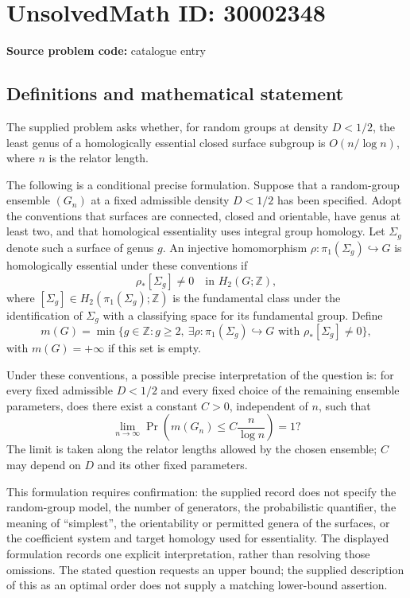 \documentclass[11pt]{article}
\newcommand{\Z}{\mathbb{Z}}
\begin{document}
\section*{UnsolvedMath ID: 30002348}
\textbf{Source problem code:} catalogue entry
\subsection{Definitions and mathematical statement}
The supplied problem asks whether, for random groups at density \(D<1/2\), the least genus of a homologically essential closed surface subgroup is \(O(n/\log n)\), where \(n\) is the relator length.

The following is a conditional precise formulation. Suppose that a random-group ensemble \((G_n)\) at a fixed admissible density \(D<1/2\) has been specified. Adopt the conventions that surfaces are connected, closed and orientable, have genus at least two, and that homological essentiality uses integral group homology. Let \(\Sigma_g\) denote such a surface of genus \(g\). An injective homomorphism \(\rho\colon\pi_1(\Sigma_g)\hookrightarrow G\) is homologically essential under these conventions if
\[
\rho_*[\Sigma_g]\ne 0\quad\text{in }H_2(G;\Z),
\]
where \([\Sigma_g]\in H_2(\pi_1(\Sigma_g);\Z)\) is the fundamental class under the identification of \(\Sigma_g\) with a classifying space for its fundamental group. Define
\[
m(G)=\min\bigl\{g\in\Z:g\ge2,\ \exists\rho\colon\pi_1(\Sigma_g)\hookrightarrow G\text{ with }\rho_*[\Sigma_g]\ne0\bigr\},
\]
with \(m(G)=+\infty\) if this set is empty.

Under these conventions, a possible precise interpretation of the question is: for every fixed admissible \(D<1/2\) and every fixed choice of the remaining ensemble parameters, does there exist a constant \(C>0\), independent of \(n\), such that
\[
\lim_{n\to\infty}\Pr\!\left(m(G_n)\le C\frac{n}{\log n}\right)=1?
\]
The limit is taken along the relator lengths allowed by the chosen ensemble; \(C\) may depend on \(D\) and its other fixed parameters.

This formulation requires confirmation: the supplied record does not specify the random-group model, the number of generators, the probabilistic quantifier, the meaning of ``simplest'', the orientability or permitted genera of the surfaces, or the coefficient system and target homology used for essentiality. The displayed formulation records one explicit interpretation, rather than resolving those omissions. The stated question requests an upper bound; the supplied description of this as an optimal order does not supply a matching lower-bound assertion.
\end{document}
